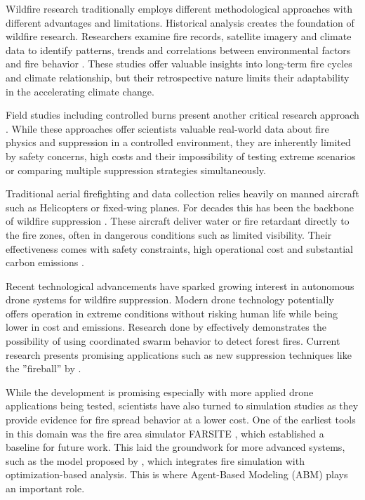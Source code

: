 \documentclass[11pt, a4paper]{article}
\begin{document}
Wildfire research traditionally employs different methodological approaches with different advantages and limitations. Historical analysis creates the foundation of wildfire research. Researchers examine fire records, satellite imagery and climate data to identify patterns, trends and correlations between environmental factors and fire behavior \citep{copernicus-wildfires,IPCC2023}. These studies offer valuable insights into long-term fire cycles and climate relationship, but their retrospective nature limits their adaptability in the accelerating climate change. 

Field studies including controlled burns present another critical research approach \citep{wildland}. While these approaches offer scientists valuable real-world data about fire physics and suppression in a controlled environment, they are inherently limited by safety concerns, high costs and their impossibility of testing extreme scenarios or comparing multiple suppression strategies simultaneously.

Traditional aerial firefighting and data collection relies heavily on manned aircraft such as Helicopters or fixed-wing planes. For decades this has been the backbone of wildfire suppression \citep{janney2012airtankers}. These aircraft deliver water or fire retardant directly to the fire zones, often in dangerous conditions such as limited visibility. Their effectiveness comes with safety constraints, high operational cost and substantial carbon emissions \citep{spicerRapidMeasurementEmissions2009}.

Recent technological advancements have sparked growing interest in autonomous drone systems for wildfire suppression. Modern drone technology potentially offers operation in extreme conditions without risking human life while being lower in cost and emissions. Research done by \citet{Yan2024} effectively demonstrates the possibility of using coordinated swarm behavior to detect forest fires. Current research presents promising applications such as new suppression techniques like the ''fireball'' by \citet{fireBalls}.

While the development is promising especially with more applied drone applications being tested, scientists have also turned to simulation studies as they provide evidence for fire spread behavior at a lower cost. One of the earliest tools in this domain was the fire area simulator FARSITE \citep{FARSITE}, which established a baseline for future work. This laid the groundwork for more advanced systems, such as the model proposed by \citet{integrated_simulation}, which integrates fire simulation with optimization-based analysis.
This is where Agent-Based Modeling (ABM) plays an important role.
\end{document}
